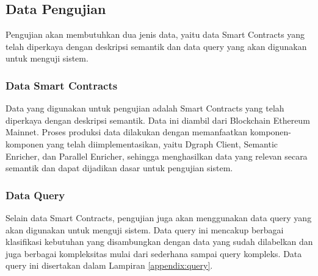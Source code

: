 \subsection{Data Pengujian}

Pengujian akan membutuhkan dua jenis data, yaitu data Smart Contracts yang telah diperkaya dengan deskripsi semantik dan data query yang akan digunakan untuk menguji sistem.

\subsubsection{Data Smart Contracts}

Data yang digunakan untuk pengujian adalah Smart Contracts yang telah diperkaya dengan deskripsi semantik. Data ini diambil dari Blockchain Ethereum Mainnet. Proses produksi data dilakukan dengan memanfaatkan komponen-komponen yang telah diimplementasikan, yaitu Dgraph Client, Semantic Enricher, dan Parallel Enricher, sehingga menghasilkan data yang relevan secara semantik dan dapat dijadikan dasar untuk pengujian sistem.

\subsubsection{Data Query}

Selain data Smart Contracts, pengujian juga akan menggunakan data query yang akan digunakan untuk menguji sistem. Data query ini mencakup berbagai klasifikasi kebutuhan yang disambungkan dengan data yang sudah dilabelkan dan juga berbagai kompleksitas mulai dari sederhana sampai query kompleks. Data query ini disertakan dalam Lampiran \ref{appendix:query}.